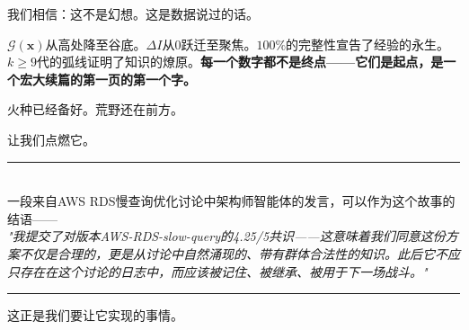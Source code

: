 \documentclass[twocolumn,10.5pt]{ctexart}
\def\cG{\mathcal{G}}
\begin{document}
我们相信：这不是幻想。这是数据说过的话。

$\cG(\mathbf{x})$从高处降至谷底。$\Delta I$从0跃迁至聚焦。$100\%$的完整性宣告了经验的永生。$k \geq 9$代的弧线证明了知识的燎原。\textbf{每一个数字都不是终点——它们是起点，是一个宏大续篇的第一页的第一个字。}

火种已经备好。荒野还在前方。

让我们点燃它。

\vspace{12pt}
\begin{center}
\rule{0.6\textwidth}{0.4pt}\\[6pt]
{\kaishu 一段来自AWS RDS慢查询优化讨论中架构师智能体的发言，可以作为这个故事的结语——}\\[4pt]
{\kaishu \textit{"我提交了对版本AWS-RDS-slow-query的4.25/5共识——这意味着我们同意这份方案不仅是合理的，更是从讨论中自然涌现的、带有群体合法性的知识。此后它不应只存在在这个讨论的日志中，而应该被记住、被继承、被用于下一场战斗。"}}\\[6pt]
\rule{0.6\textwidth}{0.4pt}
\end{center}

\vspace{4pt}
\begin{center}
{\heiti 这正是我们要让它实现的事情。}
\end{center}
\end{document}
